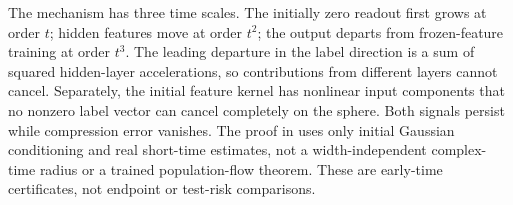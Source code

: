 The mechanism has three time scales. The initially zero readout first grows
at order $t$; hidden features move at order $t^2$; the output departs from
frozen-feature training at order $t^3$. The leading departure in the label
direction is a sum of squared hidden-layer accelerations, so contributions
from different layers cannot cancel. Separately, the initial feature kernel
has nonlinear input components that no nonzero label vector can cancel
completely on the sphere. Both signals persist while compression error
vanishes. The proof in  uses only
initial Gaussian conditioning and real short-time estimates, not a
width-independent complex-time radius or a trained population-flow theorem.
These are early-time certificates, not endpoint or test-risk comparisons.
